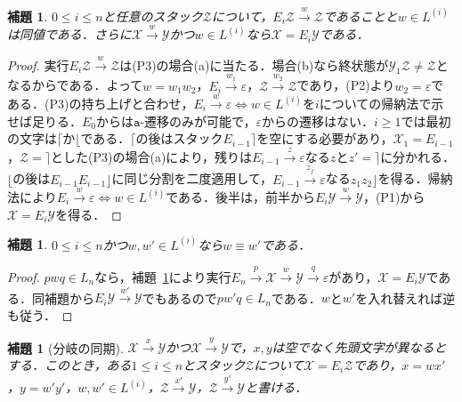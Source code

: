 \documentclass[11pt,a4paper]{ltjsarticle}
\numberwithin{equation}{section}
\theoremstyle{plain}
\newtheorem{lemma}[theorem]{補題}
\theoremstyle{definition}
\theoremstyle{remark}
\newcommand{\eps}{\varepsilon}
\begin{document}
\begin{lemma}\label{lem:app-br-recognition}
$0\le i\le n$と任意のスタック$\mathcal Z$について，$E_i\mathcal Z\xrightarrow{w}\mathcal Z$であることと$w\in L^{(i)}$は同値である．さらに$\mathcal X\xrightarrow{w}\mathcal Y$かつ$w\in L^{(i)}$なら$\mathcal X=E_i\mathcal Y$である．
\end{lemma}

\begin{proof}
実行$E_i\mathcal Z\xrightarrow{w}\mathcal Z$は(P3)の場合(a)に当たる．場合(b)なら終状態が$\mathcal Y_1\mathcal Z\ne\mathcal Z$となるからである．よって$w=w_1w_2$，$E_i\xrightarrow{w_1}\eps$，$\mathcal Z\xrightarrow{w_2}\mathcal Z$であり，(P2)より$w_2=\eps$である．(P3)の持ち上げと合わせ，$E_i\xrightarrow{w}\eps\iff w\in L^{(i)}$を$i$についての帰納法で示せば足りる．$E_0$からは$\mathtt a$-遷移のみが可能で，$\eps$からの遷移はない．$i\ge1$では最初の文字は$\lceil$か$\lfloor$である．$\lceil$の後はスタック$E_{i-1}\rceil$を空にする必要があり，$\mathcal X_1=E_{i-1}$，$\mathcal Z=\rceil$とした(P3)の場合(a)により，残りは$E_{i-1}\xrightarrow{z}\eps$なる$z$と$z'=\rceil$に分かれる．$\lfloor$の後は$E_{i-1}E_{i-1}\rfloor$に同じ分割を二度適用して，$E_{i-1}\xrightarrow{z_j}\eps$なる$z_1z_2\rfloor$を得る．帰納法により$E_i\xrightarrow{w}\eps\iff w\in L^{(i)}$である．後半は，前半から$E_i\mathcal Y\xrightarrow{w}\mathcal Y$，(P1)から$\mathcal X=E_i\mathcal Y$を得る．
\end{proof}

\begin{lemma}\label{lem:app-br-exchange}
$0\le i\le n$かつ$w,w'\in L^{(i)}$なら$w\equiv w'$である．
\end{lemma}

\begin{proof}
$pwq\in L_n$なら，補題~\ref{lem:app-br-recognition}により実行$E_n\xrightarrow{p}\mathcal X\xrightarrow{w}\mathcal Y\xrightarrow{q}\eps$があり，$\mathcal X=E_i\mathcal Y$である．同補題から$E_i\mathcal Y\xrightarrow{w'}\mathcal Y$でもあるので$pw'q\in L_n$である．$w$と$w'$を入れ替えれば逆も従う．
\end{proof}

\begin{lemma}[分岐の同期]\label{lem:app-br-branch}
$\mathcal X\xrightarrow{x}\mathcal Y$かつ$\mathcal X\xrightarrow{y}\mathcal Y$で，$x,y$は空でなく先頭文字が異なるとする．このとき，ある$1\le i\le n$とスタック$\mathcal Z$について$\mathcal X=E_i\mathcal Z$であり，$x=wx'$，$y=w'y'$，$w,w'\in L^{(i)}$，$\mathcal Z\xrightarrow{x'}\mathcal Y$，$\mathcal Z\xrightarrow{y'}\mathcal Y$と書ける．
\end{lemma}
\end{document}
